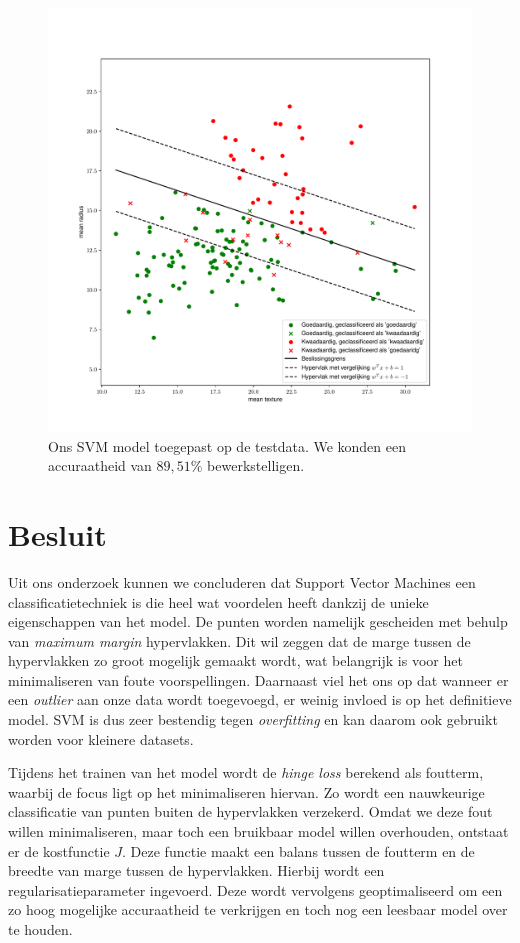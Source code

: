 \documentclass[twoside, kulak]{kulakreport}
\begin{document}
	\begin{figure}
		\centering
		\includegraphics[width=.9\textwidth]{testdata}
		\caption{Ons SVM model toegepast op de testdata. We konden een accuraatheid van \(89,51\%\) bewerkstelligen.}
		\label{fig:testdata}
	\end{figure}
	
	\chapter*{Besluit}
	
	Uit ons onderzoek kunnen we concluderen dat Support Vector Machines een classificatietechniek is die heel wat voordelen heeft dankzij de unieke eigenschappen van het model. De punten worden namelijk gescheiden met behulp van \textit{maximum margin} hypervlakken. Dit wil zeggen dat de marge tussen de hypervlakken zo groot mogelijk gemaakt wordt, wat belangrijk is voor het minimaliseren van foute voorspellingen. Daarnaast viel het ons op dat wanneer er een \textit{outlier} aan onze data wordt toegevoegd, er weinig invloed is op het definitieve model. SVM is dus zeer bestendig tegen \textit{overfitting} en kan daarom ook  gebruikt worden voor kleinere datasets.
	
	Tijdens het trainen van het model wordt de \textit{hinge loss} berekend als foutterm, waarbij de focus ligt op het minimaliseren hiervan. Zo wordt een nauwkeurige classificatie van punten buiten de hypervlakken verzekerd. Omdat we deze fout willen minimaliseren, maar toch een bruikbaar model willen overhouden, ontstaat er de kostfunctie \(J\). Deze functie maakt een balans tussen de foutterm en de breedte van marge tussen de hypervlakken. Hierbij wordt een regularisatieparameter ingevoerd. Deze wordt vervolgens geoptimaliseerd om een zo hoog mogelijke accuraatheid te verkrijgen en toch nog een leesbaar model over te houden.
	
\end{document}
